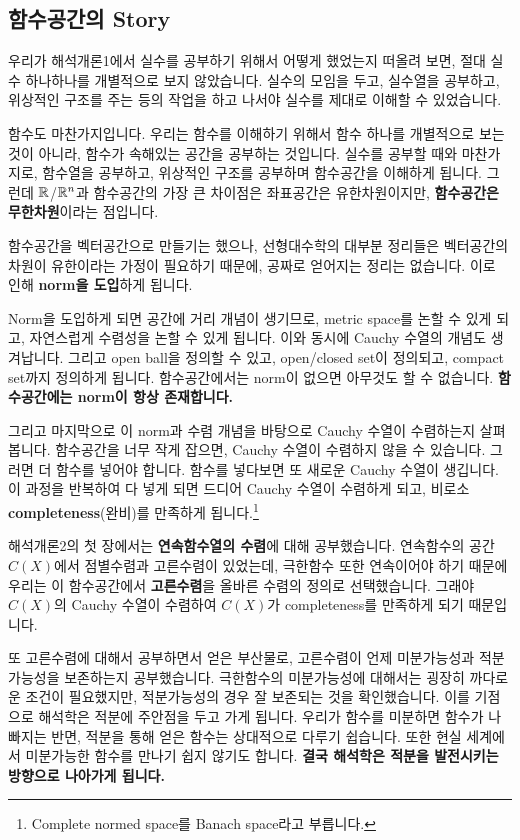\subsection*{함수공간의 Story}

우리가 해석개론1에서 실수를 공부하기 위해서 어떻게 했었는지 떠올려 보면, 절대 실수 하나하나를 개별적으로 보지 않았습니다. 실수의 모임을 두고, 실수열을 공부하고, 위상적인 구조를 주는 등의 작업을 하고 나서야 실수를 제대로 이해할 수 있었습니다.

함수도 마찬가지입니다. 우리는 함수를 이해하기 위해서 함수 하나를 개별적으로 보는 것이 아니라, 함수가 속해있는 공간을 공부하는 것입니다. 실수를 공부할 때와 마찬가지로, 함수열을 공부하고, 위상적인 구조를 공부하며 함수공간을 이해하게 됩니다. 그런데 \(\mathbb{R}\)/\(\mathbb{R}^n\)과 함수공간의 가장 큰 차이점은 좌표공간은 유한차원이지만, \textbf{함수공간은 무한차원}이라는 점입니다.

함수공간을 벡터공간으로 만들기는 했으나, 선형대수학의 대부분 정리들은 벡터공간의 차원이 유한이라는 가정이 필요하기 때문에, 공짜로 얻어지는 정리는 없습니다. 이로 인해 \textbf{norm을 도입}하게 됩니다.

Norm을 도입하게 되면 공간에 거리 개념이 생기므로, metric space를 논할 수 있게 되고, 자연스럽게 수렴성을 논할 수 있게 됩니다. 이와 동시에 Cauchy 수열의 개념도 생겨납니다. 그리고 open ball을 정의할 수 있고, open/closed set이 정의되고, compact set까지 정의하게 됩니다. 함수공간에서는 norm이 없으면 아무것도 할 수 없습니다. \textbf{함수공간에는 norm이 항상 존재합니다.}

그리고 마지막으로 이 norm과 수렴 개념을 바탕으로 Cauchy 수열이 수렴하는지 살펴봅니다. 함수공간을 너무 작게 잡으면, Cauchy 수열이 수렴하지 않을 수 있습니다. 그러면 더 함수를 넣어야 합니다. 함수를 넣다보면 또 새로운 Cauchy 수열이 생깁니다. 이 과정을 반복하여 다 넣게 되면 드디어 Cauchy 수열이 수렴하게 되고, 비로소 \textbf{completeness}(완비)를 만족하게 됩니다.\footnote{Complete normed space를 Banach space라고 부릅니다.}

해석개론2의 첫 장에서는 \textbf{연속함수열의 수렴}에 대해 공부했습니다. 연속함수의 공간 \(C(X)\)에서 점별수렴과 고른수렴이 있었는데, 극한함수 또한 연속이어야 하기 때문에 우리는 이 함수공간에서 \textbf{고른수렴}을 올바른 수렴의 정의로 선택했습니다. 그래야 \(C(X)\)의 Cauchy 수열이 수렴하여 \(C(X)\)가 completeness를 만족하게 되기 때문입니다.

또 고른수렴에 대해서 공부하면서 얻은 부산물로, 고른수렴이 언제 미분가능성과 적분가능성을 보존하는지 공부했습니다. 극한함수의 미분가능성에 대해서는 굉장히 까다로운 조건이 필요했지만, 적분가능성의 경우 잘 보존되는 것을 확인했습니다. 이를 기점으로 해석학은 적분에 주안점을 두고 가게 됩니다. 우리가 함수를 미분하면 함수가 나빠지는 반면, 적분을 통해 얻은 함수는 상대적으로 다루기 쉽습니다. 또한 현실 세계에서 미분가능한 함수를 만나기 쉽지 않기도 합니다. \textbf{결국 해석학은 적분을 발전시키는 방향으로 나아가게 됩니다.}

